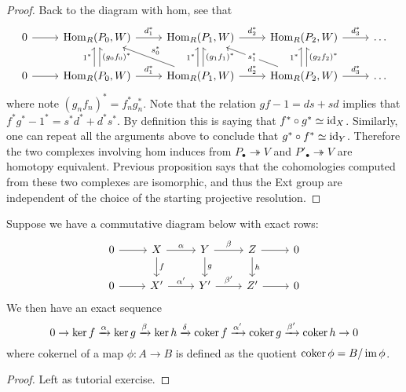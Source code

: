 \begin{proof}
	Back to the diagram with hom, see that
	\[\begin{tikzcd}[sep=small]
	0 && {\h_R(P_0,W)} && {\h_R(P_1,W)} && {\h_R(P_2,W)} && \dots \\
	\\
	0 && {\h_R(P_0,W)} && {\h_R(P_1,W)} && {\h_R(P_2,W)} && \dots
	\arrow[from=1-1, to=1-3]
	\arrow["{d_1^*}", from=1-3, to=1-5]
	\arrow["{d_2^*}", from=1-5, to=1-7]
	\arrow["{d_3^*}", from=1-7, to=1-9]
	\arrow[from=3-1, to=3-3]
	\arrow["{(g_0f_0)^*}"', shift right, harpoon', from=3-3, to=1-3]
	\arrow["{1^*}", shift left, harpoon, from=3-3, to=1-3]
	\arrow["{d_1^*}", from=3-3, to=3-5]
	\arrow["{s_0^*}"', from=3-5, to=1-3]
	\arrow["{(g_1f_1)^*}"', shift right, harpoon', from=3-5, to=1-5]
	\arrow["{1^*}", shift left, harpoon, from=3-5, to=1-5]
	\arrow["{d_2^*}", from=3-5, to=3-7]
	\arrow["{s_1^*}"{description}, from=3-7, to=1-5]
	\arrow["{(g_2 f_2)^*}"', shift right, harpoon', from=3-7, to=1-7]
	\arrow["{1^*}", shift left, harpoon, from=3-7, to=1-7]
	\arrow["{d_3^*}", from=3-7, to=3-9]
	\end{tikzcd}\]
	where note $(g_n f_n)^* = f_n^* g_n^*$. Note that the relation $gf-1 = ds + sd$ implies that $f^*g^* - 1^* = s^*d^* + d^*s^*$. By definition this is saying that $f^*\circ g^* \simeq \operatorname{id}_X$. Similarly, one can repeat all the arguments above to conclude that $g^*\circ f^* \simeq \operatorname{id}_Y$. Therefore the two complexes involving hom induces from $P_\bullet\twoheadrightarrow V$ and $P'_\bullet\twoheadrightarrow V$ are homotopy equivalent. Previous proposition says that the cohomologies computed from these two complexes are isomorphic, and thus the Ext group are independent of the choice of the starting projective resolution.
\end{proof}

\begin{thm} 
    Suppose we have a commutative diagram below with exact rows:
    \[\begin{tikzcd} [sep = small]
	0 && X && Y && Z && 0 \\
	\\
	0 && {X'} && {Y'} && {Z'} && 0
	\arrow[from=1-1, to=1-3]
	\arrow["\alpha", from=1-3, to=1-5]
	\arrow["f", from=1-3, to=3-3]
	\arrow["\beta", from=1-5, to=1-7]
	\arrow["g", from=1-5, to=3-5]
	\arrow[from=1-7, to=1-9]
	\arrow["h", from=1-7, to=3-7]
	\arrow[from=3-1, to=3-3]
	\arrow["{\alpha'}", from=3-3, to=3-5]
	\arrow["{\beta'}", from=3-5, to=3-7]
	\arrow[from=3-7, to=3-9]
    \end{tikzcd}\]
    We then have an exact sequence
    \[0 \to \ker f \xrightarrow{\alpha} \ker g \xrightarrow{\beta} \ker h \xrightarrow{\delta} \operatorname{coker} f \xrightarrow{\alpha'} \operatorname{coker} g \xrightarrow{\beta'} \operatorname{coker} h \to 0\]
    where cokernel of a map $\phi:A\to B$ is defined as the quotient $\operatorname{coker} \phi = B/\operatorname{im} \phi$.
\end{thm}
\begin{proof}
    Left as tutorial exercise.
\end{proof}

